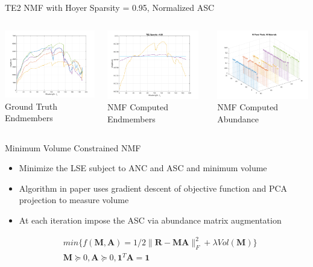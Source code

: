 \documentclass{beamer}
\begin{document}
\begin{frame}{TE2 NMF with Hoyer Sparsity = 0.95, Normalized  ASC}
\begin{columns}
    \begin{column}{0.33\textwidth}
        \includegraphics[width=4cm,center]{reflectance}
        \\ Ground Truth Endmembers
        \centering
    \end{column}
    \begin{column}{0.33\textwidth}
        \includegraphics[width=4cm,center]{nmf_endmembers_te2_95.png}
        \\ NMF Computed Endmembers
        \centering
    \end{column}
    \begin{column}{0.33\textwidth}
        \includegraphics[width=4cm,center]{nmf_abundance_te2_95_allmaterials.png}
        \\ NMF Computed Abundance
        \centering
    \end{column}
\end{columns}
\end{frame}

\begin{frame}{Minimum Volume Constrained NMF}
\begin{itemize}
\item Minimize the LSE subject to ANC and ASC and minimum volume
\item Algorithm in paper uses gradient descent of objective function and PCA projection to measure volume
\item At each iteration impose the ASC via abundance matrix augmentation
\end{itemize}

\begin{align*}
    & min\{f(\mathbf{M}, \mathbf{A}) = 1/2\| \mathbf{R} - \mathbf{M}\mathbf{A} \|_F^2 + \lambda Vol(\mathbf{M})\} \\
    & \mathbf{M} \succeq 0, \mathbf{A} \succeq 0, \mathbf{1}^T\mathbf{A} = \mathbf{1}
\end{align*}
\end{frame}
\end{document}
